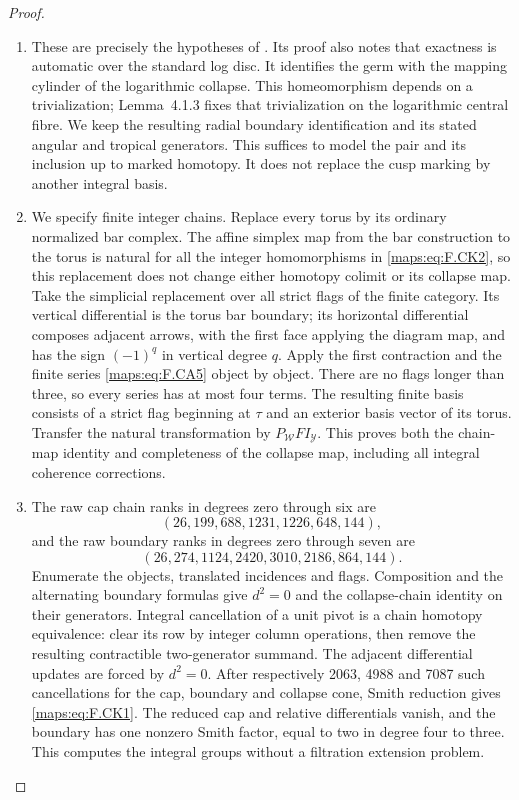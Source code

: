 \begin{proof}
\begin{enumerate}[label={$\langle1\rangle$\arabic*.}]
\item These are precisely the hypotheses of
\cite[Theorem~4.1.1, pp.~480--482]{ffAchingerOgus20}.
Its proof also notes that exactness is automatic over the
standard log disc.  It identifies the germ with the mapping
cylinder of the logarithmic collapse.  This homeomorphism
depends on a trivialization; Lemma~4.1.3 fixes that
trivialization on the logarithmic central fibre.  We keep
the resulting radial boundary identification and its stated
angular and tropical generators.  This suffices to model
the pair and its inclusion up to marked homotopy.  It does
not replace the cusp marking by another integral
basis.

\item We specify finite integer chains.  Replace every
torus by its ordinary normalized bar complex.  The affine
simplex map from the bar construction to the torus is natural
for all the integer homomorphisms in \eqref{maps:eq:F.CK2}, so this replacement
does not change either homotopy colimit or its collapse map.
Take the simplicial replacement over all strict flags of the
finite category.  Its vertical differential is the torus bar
boundary; its horizontal differential composes adjacent
arrows, with the first face applying the diagram map, and
has the sign $(-1)^q$ in vertical degree $q$.
Apply the first contraction and the finite series \eqref{maps:eq:F.CA5}
object by object.  There are no flags longer than three,
so every series has at most four terms.  The resulting
finite basis consists of a strict flag beginning at $\tau$
and an exterior basis vector of its torus.  Transfer the
natural transformation by $P_{\mathcal W}FI_{\mathcal Y}$.
This proves both the chain-map identity and completeness of
the collapse map, including all integral coherence corrections.

\item The raw cap chain ranks in degrees zero through six are
\[
 (26,199,688,1231,1226,648,144),
\]
and the raw boundary ranks in degrees zero through seven are
\[
 (26,274,1124,2420,3010,2186,864,144).
\]
Enumerate the objects, translated incidences and flags. Composition
and the alternating boundary formulas give $d^2=0$ and the
collapse-chain identity on their generators.  Integral cancellation of a
unit pivot is a chain homotopy equivalence: clear its row by
integer column operations, then remove the resulting
contractible two-generator summand.  The adjacent differential
updates are forced by $d^2=0$.  After respectively 2063,
4988 and 7087 such cancellations for the cap, boundary and
collapse cone, Smith reduction gives \eqref{maps:eq:F.CK1}. The reduced cap and
relative differentials vanish, and the boundary has one
nonzero Smith factor, equal to two in degree four to three.
This computes the integral groups without a filtration
extension problem.
\end{enumerate}
\end{proof}


